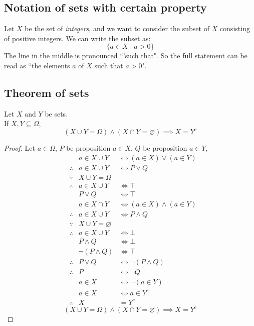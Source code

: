 \documentclass[a4paper]{article}
\begin{document}
\subsection{Notation of sets with certain property}
Let $X$ be the set of \emph{integers}, and we want to consider the subset of $X$ consisting of positive integers. We can write the subset as: 
$$\{ a \in X \mid a > 0\}$$
The line in the middle is pronounced ``'such that". So the full statement can be read as ``the elements $a$ of $X$ such that $a > 0$".

\subsection{Theorem of sets}
\begin{thm}
Let $X$ and $Y$ be sets.\\
If $X, Y \subseteq \Omega$, $$(X \cup Y = \Omega) \land (X \cap Y = \varnothing) \implies X = Y^c$$
\end{thm}
\begin{proof}
Let $a \in \Omega$,
$P$ be proposition $a \in X$, $Q$ be proposition $a \in Y$,
\begin{align*}
	&&a \in X \cup Y &\iff (a \in X) \lor (a \in Y) \tag{Union definition}\\
	&\therefore &a \in X \cup Y &\iff P \lor Q\\
	&\because &X \cup Y = \Omega \\
	&\therefore &a \in X \cup Y &\iff \top\\
	&&P \lor Q &\iff \top\\
	&&a \in X \cap Y &\iff (a \in X) \land (a \in Y) \tag{Intersection definition}\\
	&\therefore &a \in X \cup Y &\iff P \land Q\\
	&\because &X \cup Y = \varnothing\\
	&\therefore &a \in X \cup Y &\iff \bot\\
	&&P \land Q &\iff \bot\\
	&&\lnot (P \land Q) &\iff \top\\
	&\therefore &P \lor Q &\iff \lnot (P \land Q)\\
	&\therefore &P &\iff \lnot Q\\
	&& a \in X &\iff \lnot(a \in Y)\\
	&& a \in X &\iff a \in Y^c \tag{Complement definition}\\
	&\therefore &X &= Y^c
\end{align*}
$$(X \cup Y = \Omega) \land (X \cap Y = \varnothing) \implies X = Y^c$$
\end{proof}
\end{document}
